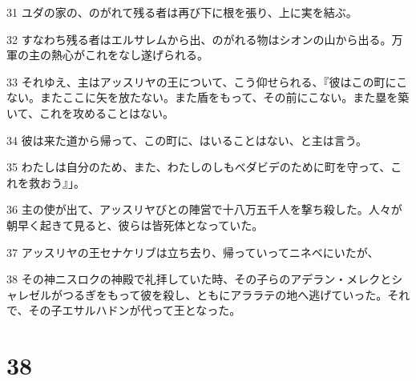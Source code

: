 \par 31 ユダの家の、のがれて残る者は再び下に根を張り、上に実を結ぶ。
\par 32 すなわち残る者はエルサレムから出、のがれる物はシオンの山から出る。万軍の主の熱心がこれをなし遂げられる。
\par 33 それゆえ、主はアッスリヤの王について、こう仰せられる、『彼はこの町にこない。またここに矢を放たない。また盾をもって、その前にこない。また塁を築いて、これを攻めることはない。
\par 34 彼は来た道から帰って、この町に、はいることはない、と主は言う。
\par 35 わたしは自分のため、また、わたしのしもべダビデのために町を守って、これを救おう』」。
\par 36 主の使が出て、アッスリヤびとの陣営で十八万五千人を撃ち殺した。人々が朝早く起きて見ると、彼らは皆死体となっていた。
\par 37 アッスリヤの王セナケリブは立ち去り、帰っていってニネベにいたが、
\par 38 その神ニスロクの神殿で礼拝していた時、その子らのアデラン・メレクとシャレゼルがつるぎをもって彼を殺し、ともにアララテの地へ逃げていった。それで、その子エサルハドンが代って王となった。

\chapter{38}

